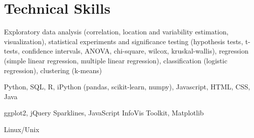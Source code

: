
\section{Technical Skills}

 Exploratory data analysis (correlation, location and variability estimation, visualization), statistical experiments and significance testing (hypothesis tests, t-tests, confidence intervals, ANOVA, chi-square, wilcox, kruskal-wallis), regression (simple linear regression, multiple linear regression), classification (logistic regression), clustering (k-means) 




 Python, SQL, R, iPython (pandas, scikit-learn, numpy), Javascript, HTML, CSS, Java

 ggplot2, jQuery Sparklines, JavaScript InfoVis Toolkit, Matplotlib

 Linux/Unix
